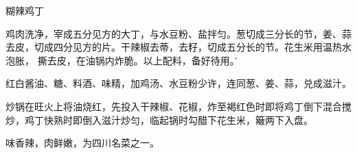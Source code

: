 \begin{recipe}[宫保鸡丁]{糊辣鸡丁}

\ingredients


\cooking

\step 鸡肉洗净，宰成五分见方的大丁，与水豆粉、盐拌匀。葱切成三分长的节，姜、蒜
去皮，切成四分见方的片。干辣椒去蒂，去籽，切成五分长的节。花生米用温热水泡胀，
撕去皮，在油锅内炸脆。以上配料，备好待用。’

\step 红白酱油、糖、料酒、味精，加鸡汤、水豆粉少许，连同葱、姜、蒜，兑成滋汁。

\step 炒锅在旺火上将油烧红，先投入干辣椒、花椒，炸至褐红色时即将鸡丁倒下混合搅
炒，鸡丁快熟时即倒入滋汁炒匀，临起锅时勾醋下花生米，簸两下入盘。

\features

味香辣，肉鲜嫩，为四川名菜之一。

\end{recipe}

